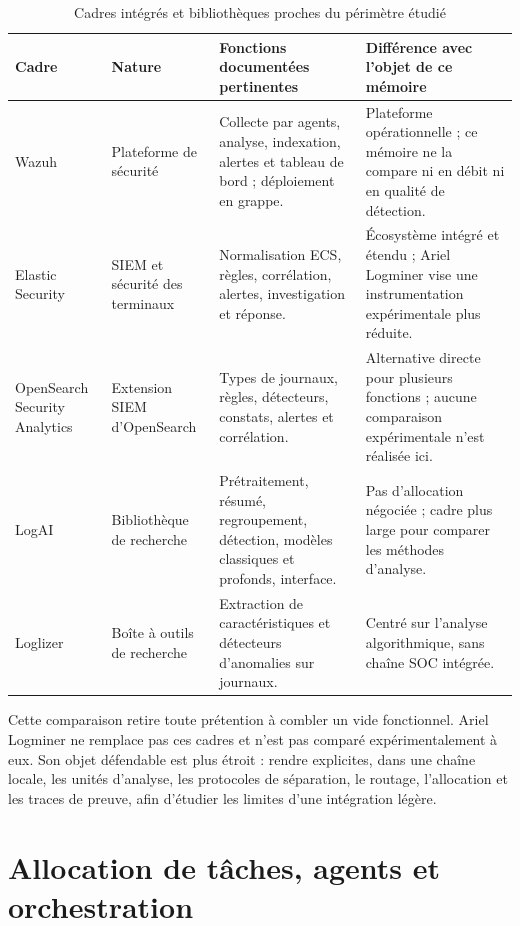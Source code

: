\begin{table}[H]
\centering
\caption{Cadres intégrés et bibliothèques proches du périmètre étudié}
\label{tab:cadres-integres}
\scriptsize
\begin{tabularx}{\textwidth}{p{2.25cm}p{2.1cm}p{3.5cm}X}
\toprule
\textbf{Cadre} & \textbf{Nature} & \textbf{Fonctions documentées pertinentes} &
\textbf{Différence avec l'objet de ce mémoire} \\
\midrule
Wazuh \cite{wazuh2026architecture} & Plateforme de sécurité &
Collecte par agents, analyse, indexation, alertes et tableau de bord ; déploiement en grappe. &
Plateforme opérationnelle ; ce mémoire ne la compare ni en débit ni en qualité de détection. \\
Elastic Security \cite{elastic2026security} & SIEM et sécurité des terminaux &
Normalisation ECS, règles, corrélation, alertes, investigation et réponse. &
Écosystème intégré et étendu ; Ariel Logminer vise une instrumentation expérimentale plus réduite. \\
OpenSearch Security Analytics \cite{opensearch2026securityanalytics} & Extension SIEM d'OpenSearch &
Types de journaux, règles, détecteurs, constats, alertes et corrélation. &
Alternative directe pour plusieurs fonctions ; aucune comparaison expérimentale n'est réalisée ici. \\
LogAI \cite{cheng2023logai} & Bibliothèque de recherche &
Prétraitement, résumé, regroupement, détection, modèles classiques et profonds, interface. &
Pas d'allocation négociée ; cadre plus large pour comparer les méthodes d'analyse. \\
Loglizer \cite{he2016experience,logpai2026loglizer} & Boîte à outils de recherche &
Extraction de caractéristiques et détecteurs d'anomalies sur journaux. &
Centré sur l'analyse algorithmique, sans chaîne SOC intégrée. \\
\bottomrule
\end{tabularx}
\end{table}

Cette comparaison retire toute prétention à combler un vide fonctionnel. Ariel Logminer ne remplace pas ces cadres et n'est pas comparé expérimentalement à eux. Son objet défendable est plus étroit : rendre explicites, dans une chaîne locale, les unités d'analyse, les protocoles de séparation, le routage, l'allocation et les traces de preuve, afin d'étudier les limites d'une intégration légère.

\section{Allocation de tâches, agents et orchestration}

